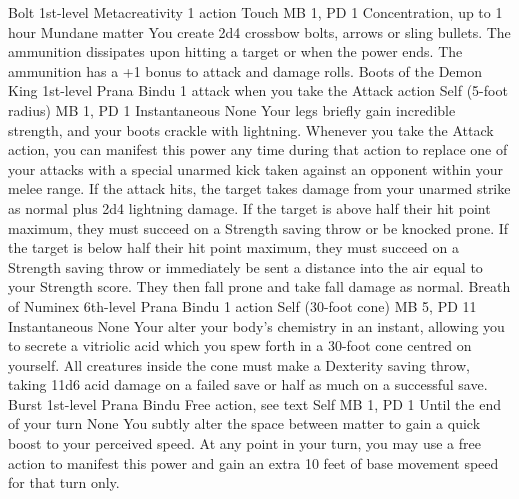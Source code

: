 \DndPowerHeader%
    {Bolt\label{pwr:bolt}}
    {1st-level Metacreativity}
    {1 action}
    {Touch}
    {MB 1, PD 1}
    {Concentration, up to 1 hour}
    {Mundane matter}
You create 2d4 crossbow bolts, arrows or
sling bullets. The ammunition dissipates upon hitting a target
or when the power ends. The ammunition has a +1 bonus to attack
and damage rolls.
\DndPowerHeader%
    {Boots of the Demon King\label{pwr:boots-of-the-demon-king}}
    {1st-level Prana Bindu}
    {1 attack when you take the Attack action}
    {Self (5-foot radius)}
    {MB 1, PD 1}
    {Instantaneous}
    {None}
Your legs briefly gain incredible strength,
and your boots crackle with lightning. Whenever you take the Attack
action, you can manifest this power any time during that action
to replace one of your attacks with a special unarmed
kick taken against an opponent within your melee range. If the
attack hits, the target takes damage from your unarmed strike
as normal plus 2d4 lightning damage. If the target is above
half their hit point maximum, they must succeed on a Strength
saving throw or be knocked prone. If the target is below half
their hit point maximum, they must succeed on a Strength saving
throw or immediately be sent a distance into the air equal
to your Strength score. They then fall prone and take fall
damage as normal.
\DndPowerHeader%
    {Breath of Numinex\label{pwr:breath-of-numinex}}
    {6th-level Prana Bindu}
    {1 action}
    {Self (30-foot cone)}
    {MB 5, PD 11}
    {Instantaneous}
    {None}
Your alter your body's chemistry in an instant,
allowing you to secrete a vitriolic acid which you spew forth
in a 30-foot cone centred on yourself. All creatures inside
the cone must make a Dexterity saving throw, taking 11d6 acid
damage on a failed save or half as much on a successful save.
\DndPowerHeader%
    {Burst\label{pwr:burst}}
    {1st-level Prana Bindu}
    {Free action, see text}
    {Self}
    {MB 1, PD 1}
    {Until the end of your turn}
    {None}
You subtly alter the space between matter
to gain a quick boost to your perceived speed. At any point
in your turn, you may use a free action to manifest this power
and gain an extra 10 feet of base movement speed for that
turn only.


